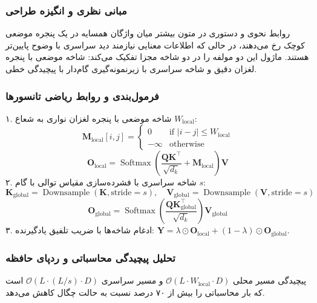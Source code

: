 \subsubsection*{مبانی نظری و انگیزه طراحی}
روابط نحوی و دستوری در متون بیشتر میان واژگان همسایه در یک پنجره موضعی کوچک رخ می‌دهند، در حالی که اطلاعات معنایی نیازمند دید سراسری با وضوح پایین‌تر هستند. ماژول  این دو مولفه را در دو شاخه مجزا تفکیک می‌کند: شاخه موضعی با پنجره لغزان دقیق و شاخه سراسری با زیرنمونه‌گیری گام‌دار با پیچیدگی خطی.

\subsubsection*{فرمول‌بندی و روابط ریاضی تانسورها}
۱. شاخه موضعی با پنجره لغزان نواری به شعاع $W_{\text{local}}$:
\begin{equation}
\mathbf{M}_{\text{local}}[i, j] = \begin{cases} 0 & \text{if } |i - j| \le W_{\text{local}} \\ -\infty & \text{otherwise} \end{cases}
\end{equation}
\begin{equation}
\mathbf{O}_{\text{local}} = \operatorname{Softmax}\left(\frac{\mathbf{Q} \mathbf{K}^\top}{\sqrt{d_k}} + \mathbf{M}_{\text{local}}\right) \mathbf{V}
\end{equation}
۲. شاخه سراسری با فشرده‌سازی مقیاس توالی با گام $s$:
\begin{equation}
\mathbf{K}_{\text{global}} = \operatorname{Downsample}(\mathbf{K}, \text{stride}=s), \quad \mathbf{V}_{\text{global}} = \operatorname{Downsample}(\mathbf{V}, \text{stride}=s)
\end{equation}
\begin{equation}
\mathbf{O}_{\text{global}} = \operatorname{Softmax}\left(\frac{\mathbf{Q} \mathbf{K}_{\text{global}}^\top}{\sqrt{d_k}}\right) \mathbf{V}_{\text{global}}
\end{equation}
۳. ادغام شاخه‌ها با ضریب تلفیق یادگیرنده: $\mathbf{Y} = \lambda \odot \mathbf{O}_{\text{local}} + (1 - \lambda) \odot \mathbf{O}_{\text{global}}$.

\subsubsection*{تحلیل پیچیدگی محاسباتی و ردپای حافظه}
پیچیدگی مسیر محلی $\mathcal{O}(L \cdot W_{\text{local}} \cdot D)$ و مسیر سراسری $\mathcal{O}(L \cdot (L/s) \cdot D)$ است که بار محاسباتی را بیش از ۷۰ درصد نسبت به حالت چگال کاهش می‌دهد.


